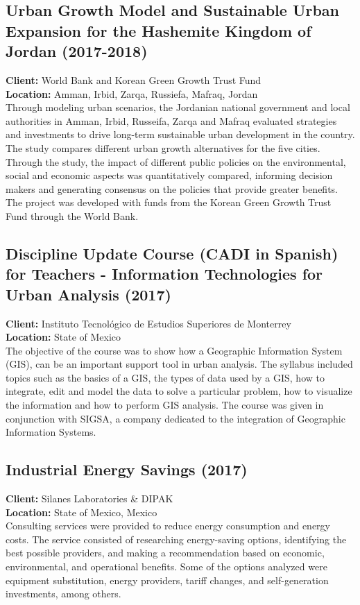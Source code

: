 \documentclass[
	a4paper,
	12pt,
	unnumberedsections,
]{CSSullivanBusinessReport}
\begin{document}
\subsection{Urban Growth Model and Sustainable Urban Expansion for the Hashemite Kingdom of Jordan (2017-2018)}
\textbf{Client:}  World Bank and Korean Green Growth Trust Fund \\
\textbf{Location:}  Amman, Irbid, Zarqa, Russiefa, Mafraq, Jordan \\[0.5em]
 Through modeling urban scenarios, the Jordanian national government and local authorities in Amman, Irbid, Russeifa, Zarqa and Mafraq evaluated strategies and investments to drive long-term sustainable urban development in the country. The study compares different urban growth alternatives for the five cities. Through the study, the impact of different public policies on the environmental, social and economic aspects was quantitatively compared, informing decision makers and generating consensus on the policies that provide greater benefits. The project was developed with funds from the Korean Green Growth Trust Fund through the World Bank.

\subsection{Discipline Update Course (CADI in Spanish) for Teachers - Information Technologies for Urban Analysis (2017)}
\textbf{Client:}  Instituto Tecnológico de Estudios Superiores de Monterrey \\
\textbf{Location:}  State of Mexico       \\[0.5em]
 The objective of the course was to show how a Geographic Information System (GIS), can be an important support tool in urban analysis. The syllabus included topics such as the basics of a GIS, the types of data used by a GIS, how to integrate, edit and model the data to solve a particular problem, how to visualize the information and how to perform GIS analysis. The course was given in conjunction with SIGSA, a company dedicated to the integration of Geographic Information Systems.

\subsection{Industrial Energy Savings (2017)}
\textbf{Client:}  Silanes Laboratories \& DIPAK \\
\textbf{Location:}  State of Mexico, Mexico      \\[0.5em]
 Consulting services were provided to reduce energy consumption and energy costs. The service consisted of researching energy-saving options, identifying the best possible providers, and making a recommendation based on economic, environmental, and operational benefits. Some of the options analyzed were equipment substitution, energy providers, tariff changes, and self-generation investments, among others.
\end{document}
